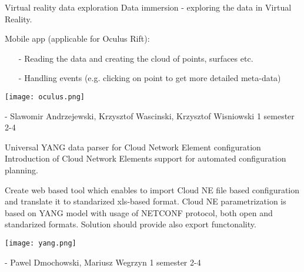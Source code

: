 \begin{project}
{Virtual reality data exploration}
{Data immersion - exploring the data in Virtual Reality.} 
{ 
Mobile app (applicable for Oculus Rift):
\begin{itemize}
	\item[-] Reading the data and creating the cloud of points, surfaces etc.
	\item[-] Handling events (e.g. clicking on point to get more detailed meta-data)
\end{itemize}
\begin{center}\texttt{[image: oculus.png]}\end{center}
}
{-}
{Slawomir Andrzejewski, Krzysztof Wascinski, Krzysztof Wisniowski}
{1 semester}
{2-4}
\end{project}
\begin{project}
{Universal YANG data parser for Cloud Network Element configuration}
{Introduction of Cloud Network Elements support for automated configuration planning.} 
{ 
Create web based tool which enables to import Cloud NE file based configuration and translate it to standarized xls-based format. Cloud NE parametrization is based on YANG model with usage of NETCONF protocol, both open and standarized formats. Solution should provide also export functonality.
\begin{center}\texttt{[image: yang.png]}\end{center}
}
{-}
{Pawel Dmochowski, Mariusz Wegrzyn}
{1 semester}
{2-4}
\end{project}
